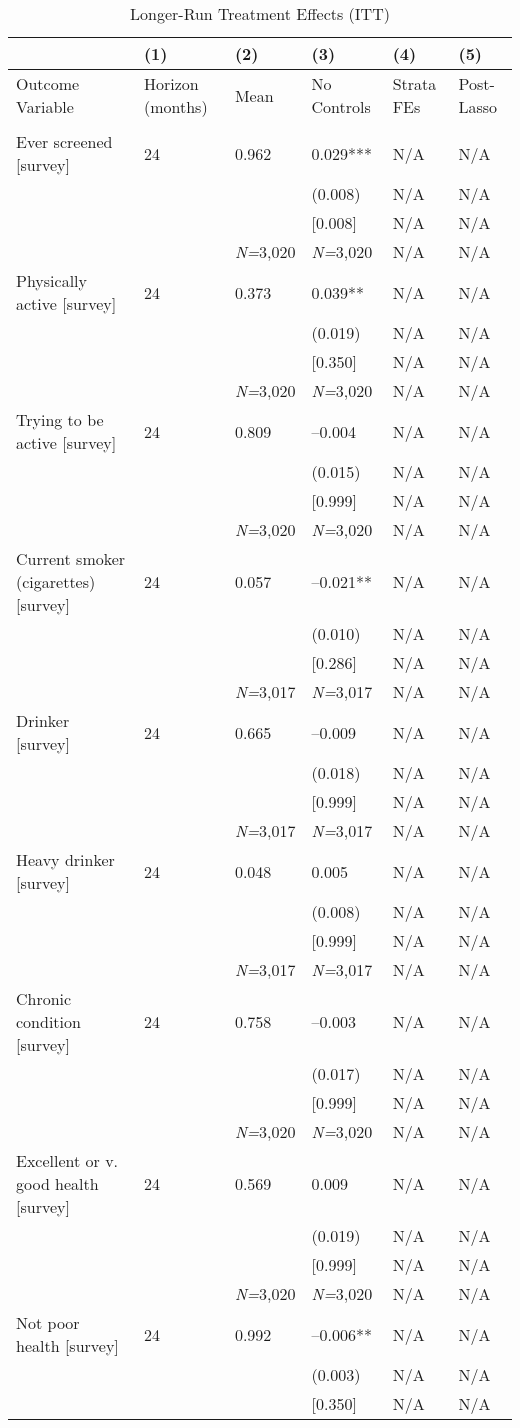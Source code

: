 \documentclass{article}
\begin{document}
\setlength{\tabcolsep}{6pt}
\begin{table}[tbp] \centering
{}

\caption{Longer-Run Treatment Effects (ITT)}
\label{tab:appendix_itt_health_vars_survey_0816_0119}
{\scriptsize
\begin{tabularx}{\linewidth}{lCCCCC}

\toprule
&{(1)}&{(2)}&{(3)}&{(4)}&{(5)} \tabularnewline \midrule
{Outcome Variable}&{Horizon (months)}&{Mean}&{No Controls}&{Strata FEs}&{Post-Lasso} \tabularnewline
\midrule 
\addlinespace[1.2ex]
& \tabularnewline
\midrule Ever screened [survey]&24&0.962&0.029***&N/A&N/A \tabularnewline
&&&(0.008)&N/A&N/A \tabularnewline
&&&[0.008]&N/A&N/A \tabularnewline
&&\textit{N=}3,020&\textit{N=}3,020&N/A&N/A \tabularnewline
\addlinespace[1.2ex]
Physically active [survey]&24&0.373&0.039**&N/A&N/A \tabularnewline
&&&(0.019)&N/A&N/A \tabularnewline
&&&[0.350]&N/A&N/A \tabularnewline
&&\textit{N=}3,020&\textit{N=}3,020&N/A&N/A \tabularnewline
\addlinespace[1.2ex]
Trying to be active [survey]&24&0.809&--0.004&N/A&N/A \tabularnewline
&&&(0.015)&N/A&N/A \tabularnewline
&&&[0.999]&N/A&N/A \tabularnewline
&&\textit{N=}3,020&\textit{N=}3,020&N/A&N/A \tabularnewline
\addlinespace[1.2ex]
Current smoker (cigarettes) [survey]&24&0.057&--0.021**&N/A&N/A \tabularnewline
&&&(0.010)&N/A&N/A \tabularnewline
&&&[0.286]&N/A&N/A \tabularnewline
&&\textit{N=}3,017&\textit{N=}3,017&N/A&N/A \tabularnewline
\addlinespace[1.2ex]
Drinker [survey]&24&0.665&--0.009&N/A&N/A \tabularnewline
&&&(0.018)&N/A&N/A \tabularnewline
&&&[0.999]&N/A&N/A \tabularnewline
&&\textit{N=}3,017&\textit{N=}3,017&N/A&N/A \tabularnewline
\addlinespace[1.2ex]
Heavy drinker [survey]&24&0.048&0.005&N/A&N/A \tabularnewline
&&&(0.008)&N/A&N/A \tabularnewline
&&&[0.999]&N/A&N/A \tabularnewline
&&\textit{N=}3,017&\textit{N=}3,017&N/A&N/A \tabularnewline
\addlinespace[1.2ex]
Chronic condition [survey]&24&0.758&--0.003&N/A&N/A \tabularnewline
&&&(0.017)&N/A&N/A \tabularnewline
&&&[0.999]&N/A&N/A \tabularnewline
&&\textit{N=}3,020&\textit{N=}3,020&N/A&N/A \tabularnewline
\addlinespace[1.2ex]
Excellent or v. good health [survey]&24&0.569&0.009&N/A&N/A \tabularnewline
&&&(0.019)&N/A&N/A \tabularnewline
&&&[0.999]&N/A&N/A \tabularnewline
&&\textit{N=}3,020&\textit{N=}3,020&N/A&N/A \tabularnewline
\addlinespace[1.2ex]
Not poor health [survey]&24&0.992&--0.006**&N/A&N/A \tabularnewline
&&&(0.003)&N/A&N/A \tabularnewline
&&&[0.350]&N/A&N/A \tabularnewline

\end{tabularx}}
\end{table}
\end{document}
